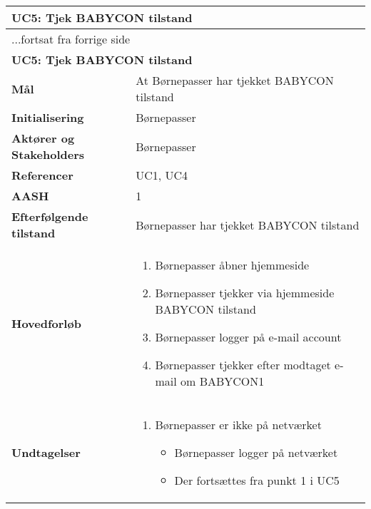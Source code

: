 \begin{center} \centering \label{kravspec:uc5}
	\begin{longtable}{|p{5cm}|p{9cm}|}  %
	\hline
		\multicolumn{2}{|l|}{\textbf{UC5: Tjek BABYCON tilstand}} \\\hline %
		\endfirsthead
		
		\multicolumn{2}{l}{...fortsat fra forrige side} \\ \hline %
		\multicolumn{2}{|l|}{\textbf{UC5: Tjek BABYCON tilstand}} \\\hline %
		\endhead	
		
		\textbf{Mål}	  &At Børnepasser har tjekket BABYCON tilstand		\\\hline
		\textbf{Initialisering}				&Børnepasser		\\\hline
		\textbf{Aktører og Stakeholders}		&Børnepasser		\\\hline 
		\textbf{Referencer}					&UC1, UC4		\\\hline
		\textbf{AASH}						&1		\\\hline
		\textbf{Efterfølgende tilstand}		&Børnepasser har tjekket BABYCON tilstand		\\\hline
		\textbf{Hovedforløb}					
			&\begin{enumerate}
				
				\item \label{kravspec:uc5_netforbindelse}Børnepasser åbner hjemmeside
				\newline [Und: \ref{kravspec:uc5_netforbindelse}.a Børnepasser er ikke på netværket]
				\item Børnepasser tjekker via hjemmeside BABYCON tilstand
				\item Børnepasser logger på e-mail account 
				\item Børnepasser tjekker efter modtaget e-mail om BABYCON1
				
			\end{enumerate}
		\\\hline
		\textbf{Undtagelser}
			&\begin{enumerate}[label=\ref{kravspec:uc5_netforbindelse}.a]
			\item Børnepasser er ikke på netværket
			\begin{itemize}
					
					\item Børnepasser logger på netværket
					\item Der fortsættes fra punkt 1 i UC5				
					
					\end{itemize} 
					
			\end{enumerate}	
			
		\\\hline
	\end{longtable} 
\end{center}

